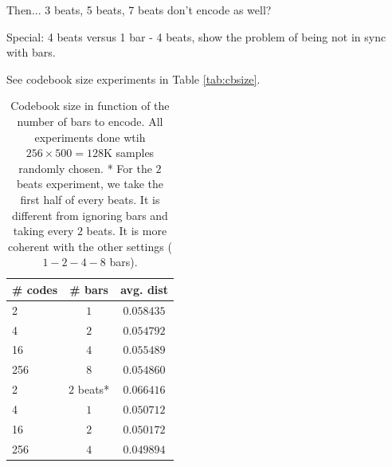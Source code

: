 \documentclass{article}
\begin{document}
Then... 3 beats, 5 beats, 7 beats don't encode as well?

Special: 4 beats versus 1 bar - 4 beats, show the problem of being
not in sync with bars.

See codebook size experiments in Table \ref{tab:cbsize}.

\begin{table}
\begin{center}
\begin{tabular}{|l|c|c|}
\hline
\# codes & \# bars & avg. dist \\ \hline \hline
2 & $1$ & $0.058435$ \\
4 & $2$ & $0.054792$ \\
16 & $4$ & $0.055489$ \\
256 & $8$ & $0.054860$ \\ \hline
2 & $2$ beats* & $0.066416$ \\
4 & $1$ & $0.050712$ \\
16 & $2$ & $0.050172$ \\
256 & $4$ & $0.049894$ \\ \hline
\end{tabular}
\end{center}
\caption{{Codebook size in function of the number of bars to encode.
All experiments done wtih $256 \times 500 = 128$K samples randomly chosen.
* For the $2$ beats experiment, we take the first half of every beats.
It is different from ignoring bars and taking every $2$ beats. It is more
coherent with the other settings ($1-2-4-8$ bars).}}
\label{tab:size_pattern}
\end{table}
\end{document}
